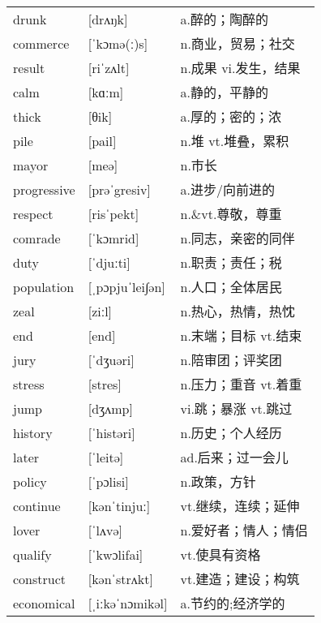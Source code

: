 \documentclass[a4paper]{article}
\begin{document}
\section{}
\begin{tabular}{l l l}

drunk & [drʌŋk] & a.醉的；陶醉的 \\
commerce & [ˈkɔmə(ː)s] & n.商业，贸易；社交 \\
result & [riˈzʌlt] & n.成果 vi.发生，结果 \\
calm & [kɑːm] & a.静的，平静的 \\
thick & [θik] & a.厚的；密的；浓 \\
pile & [pail] & n.堆 vt.堆叠，累积 \\
mayor & [meə] & n.市长 \\
progressive & [prəˈgresiv] & a.进步/向前进的 \\
respect & [risˈpekt] & n.\&vt.尊敬，尊重 \\
comrade & [ˈkɔmrid] & n.同志，亲密的同伴 \\
duty & [ˈdjuːti] & n.职责；责任；税 \\
population & [ˌpɔpjuˈlei∫ən] & n.人口；全体居民 \\
zeal & [ziːl] & n.热心，热情，热忱 \\
end & [end] & n.末端；目标 vt.结束 \\
jury & [ˈdʒuəri] & n.陪审团；评奖团 \\
stress & [stres] & n.压力；重音 vt.着重 \\
jump & [dʒʌmp] & vi.跳；暴涨 vt.跳过 \\
history & [ˈhistəri] & n.历史；个人经历 \\
later & [ˈleitə] & ad.后来；过一会儿 \\
policy & [ˈpɔlisi] & n.政策，方针 \\
continue & [kənˈtinjuː] & vt.继续，连续；延伸 \\
lover & [ˈlʌvə] & n.爱好者；情人；情侣 \\
qualify & [ˈkwɔlifai] & vt.使具有资格 \\
construct & [kənˈstrʌkt] & vt.建造；建设；构筑 \\
economical & [ˌiːkəˈnɔmikəl] & a.节约的;经济学的 \\

\end{tabular}
\end{document}
